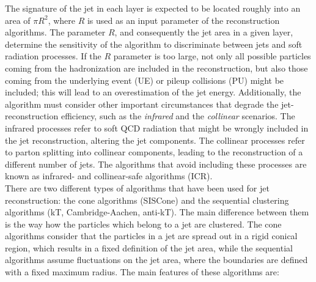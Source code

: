 \noindent The signature of the jet in each layer is expected to be located roughly 
into an area of $\pi R^{2}$, where $R$ is used as an input parameter of 
the reconstruction algorithms. The parameter $R$, and 
consequently the jet area in a given layer, determine the sensitivity of the algorithm to discriminate between 
jets and soft radiation processes. If the $R$ parameter is too large, not 
only all possible particles coming from the hadronization are included in the reconstruction,
but also those coming from the underlying event (UE) or pileup collisions (PU) might 
be included; this will lead to an overestimation of the jet energy. Additionally, the 
algorithm must consider other important circumstances that degrade
the jet-reconstruction efficiency, such as the \textit{infrared} and the \textit{collinear} 
scenarios. The infrared processes refer to soft QCD radiation that might be wrongly included in the jet 
reconstruction, altering the jet components. The collinear processes refer to parton 
splitting into collinear components, leading to the reconstruction of a different 
number of jets. The algorithms that avoid including these processes are known 
as infrared- and collinear-safe algorithms (ICR).\\

\noindent There are two different types of algorithms that have been used for jet reconstruction: the cone algorithms (SISCone)
and the sequential clustering algorithms (kT, Cambridge-Aachen, anti-kT). The main difference between them 
is the way how the particles which belong to a jet are clustered. The cone algorithms consider that the particles 
in a jet are spread out in a rigid conical region, which results in a fixed definition of the jet area, while the
sequential algorithms assume fluctuations on the jet area, where the boundaries are 
defined with a fixed maximum radius. The main features of these algorithms are:

